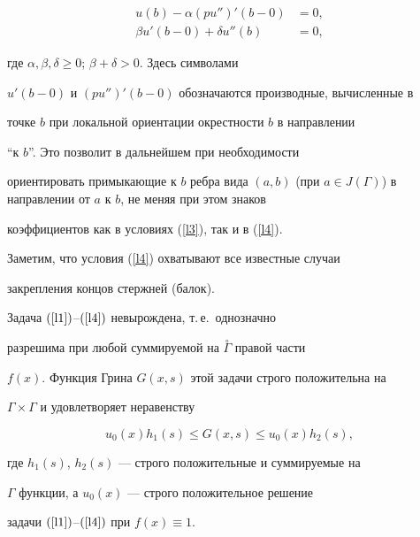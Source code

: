 {{{{{{{\begin{equation}
\begin{split}


u(b)-\alpha(pu'')'(b-0)&=0,\\


\beta u'(b-0)+\delta u''(b)&=0,


\end{split}


\end{equation}


где $\alpha,\beta,\delta \geq 0$; $\beta+\delta >0$. Здесь символами


$u'(b-0)$ и $(pu'')'(b-0)$ обозначаются производные, вычисленные в


точке $b$ при локальной ориентации окрестности $b$ в направлении


``к $b$''. Это позволит в дальнейшем при необходимости


ориентировать примыкающие к $b$ ребра вида $(a,b)$ (при $a\in


J(\Gamma)$) в направлении от $a$ к $b$, не меняя при этом знаков


коэффициентов как в условиях (\ref{l3}), так и в (\ref{l4}).


Заметим, что условия (\ref{l4}) охватывают все известные случаи


закрепления концов стержней (балок).





\begin{thm}


Задача $(\ref{l1})$--$(\ref{l4})$ невырождена, т.\,е.~однозначно


разрешима при любой суммируемой на $\overset{\circ}{\Gamma}$ правой части


$f(x)$. Функция Грина $G(x,s)$ этой задачи строго положительна на


$\Gamma \times \Gamma$ и удовлетворяет неравенству


\begin{equation}


\label{l5}


u_0(x)h_1(s)\leq G(x,s)\leq u_0(x)h_2(s),


\end{equation}


где $h_1(s)$, $h_2(s)$ --- строго положительные и суммируемые на


$\Gamma$ функции, а $u_0(x)$ --- строго положительное решение


задачи $(\ref{l1})$--$(\ref{l4})$ при $f(x)\equiv 1$.



\end{thm}}}}}}}}
